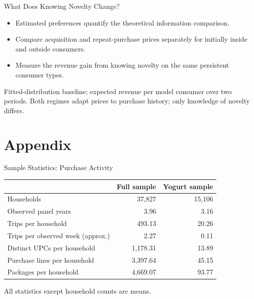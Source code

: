 \documentclass[aspectratio=169,professionalfonts]{beamer}
\newcommand{\shortbuttons}{}
\newif\ifshortappendix
\begin{document}
\gdef\shortbuttons{}
\begin{frame}[label=short-50]{What Does Knowing Novelty Change?}
  \begin{itemize}
    \item Estimated preferences quantify the theoretical information comparison.
    \item Compare acquisition and repeat-purchase prices separately for initially inside and outside consumers.
    \item Measure the revenue gain from knowing novelty on the same persistent consumer types.
  \end{itemize}
  \begin{tcolorbox}
  \end{tcolorbox}
  \par\smallskip\footnotesize Fitted-distribution baseline; expected revenue per model consumer over two periods.
  Both regimes adapt prices to purchase history; only knowledge of novelty differs.
\end{frame}





\appendix

\shortappendixtrue

\section{Appendix}

\gdef\shortbuttons{\hyperlink{short-21}{\beamergotobutton{Back to Data Sources}}}
\begin{frame}[label=short-22,noframenumbering]{Sample Statistics: Purchase Activity}
  \centering
  \small
  \renewcommand{\arraystretch}{1.15}
  \begin{tabular}{lrr}
    \toprule
     & Full sample & Yogurt sample \\
    \midrule
    Households & 37,827 & 15,106 \\
    Observed panel years & 3.96 & 3.16 \\
    Trips per household & 493.13 & 20.26 \\
    Trips per observed week (approx.) & 2.27 & 0.11 \\
    Distinct UPCs per household & 1,178.31 & 13.89 \\
    Purchase lines per household & 3,397.64 & 45.15 \\
    Packages per household & 4,669.07 & 93.77 \\
    \bottomrule
  \end{tabular}

  \medskip
  {\footnotesize All statistics except household counts are means.}
\end{frame}
\end{document}
